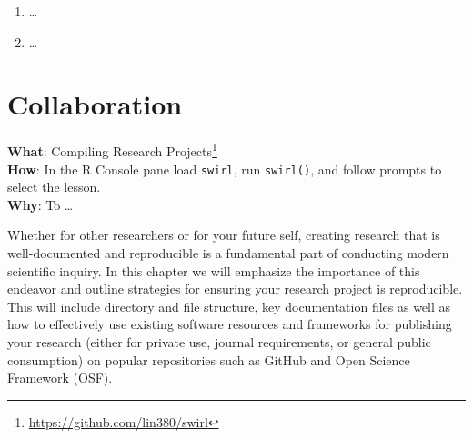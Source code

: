 \documentclass[
  letterpaper,
]{scrbook}
\providecommand{\tightlist}{%
  \setlength{\itemsep}{0pt}\setlength{\parskip}{0pt}}\usepackage{longtable,booktabs,array}
\DeclareRobustCommand{\href}[2]{#2\footnote{\url{#1}}}
\begin{document}
\begin{tcolorbox}[enhanced jigsaw, title=\textcolor{quarto-callout-note-color}{\faInfo}\hspace{0.5em}{Technical exercises}, breakable, colback=white, colframe=quarto-callout-note-color-frame, bottomrule=.15mm, left=2mm, bottomtitle=1mm, colbacktitle=quarto-callout-note-color!10!white, opacityback=0, arc=.35mm, toprule=.15mm, coltitle=black, leftrule=.75mm, opacitybacktitle=0.6, toptitle=1mm, titlerule=0mm, rightrule=.15mm]

\begin{enumerate}
\def\labelenumi{\arabic{enumi}.}
\tightlist
\item
  \ldots{}
\item
  \ldots{}
\end{enumerate}

\end{tcolorbox}

\hypertarget{sec-collaboration}{%
\chapter{Collaboration}\label{sec-collaboration}}

\begin{tcolorbox}[enhanced jigsaw, title=\textcolor{quarto-callout-tip-color}{\faLightbulb}\hspace{0.5em}{Swirl}, breakable, colback=white, colframe=quarto-callout-tip-color-frame, bottomrule=.15mm, left=2mm, bottomtitle=1mm, colbacktitle=quarto-callout-tip-color!10!white, opacityback=0, arc=.35mm, toprule=.15mm, coltitle=black, leftrule=.75mm, opacitybacktitle=0.6, toptitle=1mm, titlerule=0mm, rightrule=.15mm]

\textbf{What}: \href{https://github.com/lin380/swirl}{Compiling Research
Projects}\\
\textbf{How}: In the R Console pane load \texttt{swirl}, run
\texttt{swirl()}, and follow prompts to select the lesson.\\
\textbf{Why}: To \ldots{}

\end{tcolorbox}

Whether for other researchers or for your future self, creating research
that is well-documented and reproducible is a fundamental part of
conducting modern scientific inquiry. In this chapter we will emphasize
the importance of this endeavor and outline strategies for ensuring your
research project is reproducible. This will include directory and file
structure, key documentation files as well as how to effectively use
existing software resources and frameworks for publishing your research
(either for private use, journal requirements, or general public
consumption) on popular repositories such as GitHub and Open Science
Framework (OSF).
\end{document}
